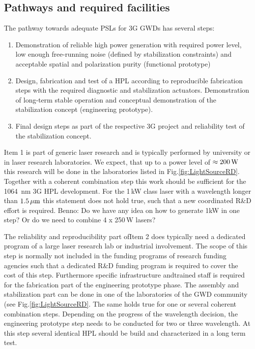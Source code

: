 \subsection{Pathways and required facilities} \label{sec:pathway}
The pathway towards adequate PSLs for 3G GWDs has several steps:
\begin{enumerate}
	\item Demonstration of reliable high power generation with required power level, low enough free-running noise (defined by stabilization constraints) and acceptable spatial and polarization purity (functional prototype)
	\item Design, fabrication and test of a HPL according to reproducible fabrication steps with the required diagnostic and stabilization actuators. Demonstration of long-term stable operation and conceptual demonstration of the stabilization concept (engineering prototype).
	\item Final design steps as part of the respective 3G project and reliability test of the stabilization concept.
\end{enumerate}

Item 1 is part of generic laser research and is typically performed by university or in laser research laboratories. We expect, that up to a power level of $ \approx 200 \, {\rm W} $ this research will be done in the laboratories listed in Fig.\ref{fig:LightSourceRD}. Together with a coherent combination step this work should be sufficient for the 1064\, nm 3G HPL development.
For the 1\,kW class laser with a wavelength longer than $ 1.5\, {\rm \mu m}$ this statement does not hold true, such that a new coordinated R\&D effort is required.
{\color{red} Benno: Do we have any idea on how to generate 1kW in one step? Or do we need to combine 4 x 250\,W lasers?}

The reliability and reproducibility part ofItem 2 does typically need a dedicated program of a large laser research lab or industrial involvement. The scope of this step is normally not included in the funding programs of research funding agencies such that a dedicated R\&D funding program is required to cover the cost of this step.
Furthermore specific infrastructure andtrained staff is required for the fabrication part of the engineering prototype phase. The assembly and stabilization part can be done in one of the laboratories of the GWD community (see Fig.\ref{fig:LightSourceRD}. The same holds true for one or several coherent combination steps. Depending on the progress of the wavelength decision, the engineering prototype step needs to be conducted for two or three wavelength. At this step several identical HPL should be build and characterized in a long term test.

